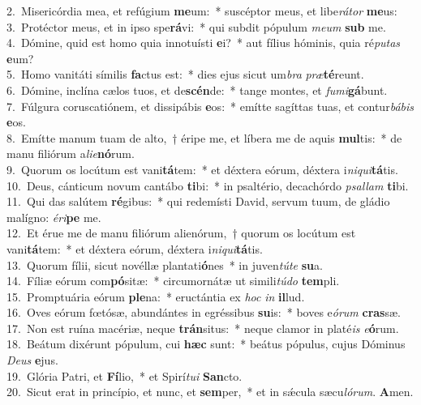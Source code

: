 {2.~}Misericórdia mea, et refúgium \textbf{me}um:~* suscéptor meus, et libe\textit{rá}\textit{tor} \textbf{me}us:\\
{3.~}Protéctor meus, et in ipso spe\textbf{rá}vi:~* qui subdit pópulum \textit{me}\textit{um} \textbf{sub} me.\\
{4.~}Dómine, quid est homo quia innotuísti \textbf{e}i?~* aut fílius hóminis, quia ré\textit{pu}\textit{tas} \textbf{e}um?\\
{5.~}Homo vanitáti símilis \textbf{fa}ctus est:~* dies ejus sicut um\textit{bra} \textit{præ}\textbf{té}reunt.\\
{6.~}Dómine, inclína cælos tuos, et de\textbf{scén}de:~* tange montes, et \textit{fu}\textit{mi}\textbf{gá}bunt.\\
{7.~}Fúlgura coruscatiónem, et dissipábis \textbf{e}os:~* emítte sagíttas tuas, et contur\textit{bá}\textit{bis} \textbf{e}os.\\
{8.~}Emítte manum tuam de alto,~† éripe me, et líbera me de aquis \textbf{mul}tis:~* de manu filiórum a\textit{li}\textit{e}\textbf{nó}rum.\\
{9.~}Quorum os locútum est vani\textbf{tá}tem:~* et déxtera eórum, déxtera i\textit{ni}\textit{qui}\textbf{tá}tis.\\
{10.~}Deus, cánticum novum cantábo \textbf{ti}bi:~* in psaltério, decachórdo \textit{psal}\textit{lam} \textbf{ti}bi.\\
{11.~}Qui das salútem \textbf{ré}gibus:~* qui redemísti David, servum tuum, de gládio malígno: \textit{é}\textit{ri}\textbf{pe} me.\\
{12.~}Et érue me de manu filiórum alienórum,~† quorum os locútum est vani\textbf{tá}tem:~* et déxtera eórum, déxtera i\textit{ni}\textit{qui}\textbf{tá}tis.\\
{13.~}Quorum fílii, sicut novéllæ plantati\textbf{ó}nes~* in juven\textit{tú}\textit{te} \textbf{su}a.\\
{14.~}Fíliæ eórum com\textbf{pó}sitæ:~* circumornátæ ut simili\textit{tú}\textit{do} \textbf{tem}pli.\\
{15.~}Promptuária eórum \textbf{ple}na:~* eructántia ex \textit{hoc} \textit{in} \textbf{il}lud.\\
{16.~}Oves eórum fœtósæ, abundántes in egréssibus \textbf{su}is:~* boves e\textit{ó}\textit{rum} \textbf{cras}sæ.\\
{17.~}Non est ruína macériæ, neque \textbf{trán}situs:~* neque clamor in platé\textit{is} \textit{e}\textbf{ó}rum.\\
{18.~}Beátum dixérunt pópulum, cui \textbf{hæc} sunt:~* beátus pópulus, cujus Dóminus \textit{De}\textit{us} \textbf{e}jus.\\
{19.~}Glória Patri, et \textbf{Fí}lio,~* et Spirí\textit{tu}\textit{i} \textbf{San}cto.\\
{20.~}Sicut erat in princípio, et nunc, et \textbf{sem}per,~* et in sǽcula sæcu\textit{ló}\textit{rum}. \textbf{A}men.\\

